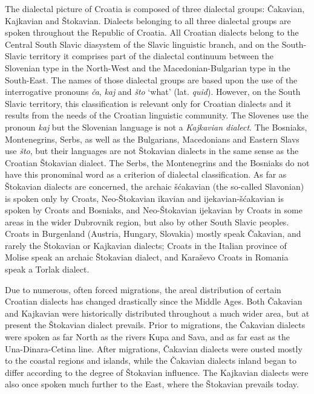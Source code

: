 \begin{multicols}{2}
The dialectal picture of Croatia is composed of three dialectal groups: Čakavian, Kajkavian and Štokavian. Dialects belonging to all three dialectal groups are spoken throughout the Republic of Croatia. All Croatian dialects belong to the Central South Slavic diasystem of the Slavic linguistic branch, and on the South-Slavic territory it comprises part of the dialectal continuum between the Slovenian type in the North-West and the Macedonian-Bulgarian type in the South-East. The names of those dialectal groups are based upon the use of the interrogative pronouns \emph{ča}, \emph{kaj} and \emph{što} ‘what’ (lat. \emph{quid}). However, on the South Slavic territory, this classification is relevant only for Croatian dialects and it results from the needs of the Croatian linguistic community. The Slovenes use the pronoun \emph{kaj} but the Slovenian language is not a \emph{Kajkavian dialect}. The Bosniaks, Montenegrins, Serbs, as well as the Bulgarians, Macedonians and Eastern Slavs use \emph{što}, but their languages are not Štokavian dialects in the same sense as the Croatian Štokavian dialect. The Serbs, the Montenegrins and the Bosniaks do not have this pronominal word as a criterion of dialectal classification. As far as Štokavian dialects are concerned, the archaic šćakavian (the so-called Slavonian) is spoken only by Croats, Neo-Štokavian ikavian and ijekavian-šćakavian is spoken by Croats and Bosniaks, and Neo-Štokavian ijekavian by Croats in some areas in the wider Dubrovnik region, but also by other South Slavic peoples. Croats in Burgenland (Austria, Hungary, Slovakia) mostly speak Čakavian, and rarely the Štokavian or Kajkavian dialects; Croats in the Italian province of Molise speak an archaic Štokavian dialect, and Karaševo Croats in Romania speak a Torlak dialect.

Due to numerous, often forced migrations, the areal distribution of certain Croatian dialects has changed drastically since the Middle Ages. Both Čakavian and Kajkavian were historically distributed throughout a much wider area, but at present the Štokavian dialect prevails. Prior to migrations, the Čakavian dialects were spoken as far North as the rivers Kupa and Sava, and as far east as the Una-Dinara-Cetina line. After migrations, Čakavian dialects were ousted mostly to the coastal regions and islands, while the Čakavian dialects inland began to differ according to the degree of Štokavian influence. The Kajkavian dialects were also once spoken much further to the East, where the Štokavian prevails today.


\end{multicols}
